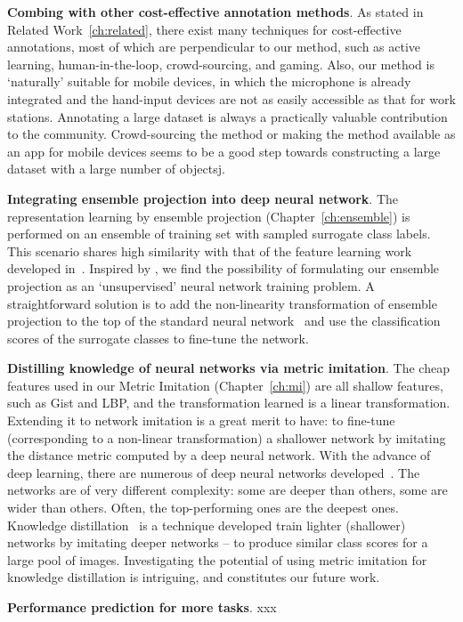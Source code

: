 \textbf{Combing with other cost-effective annotation methods}. As stated in Related Work~\ref{ch:related}, there exist many techniques for cost-effective annotations, most of which are perpendicular to our method, such as active learning, human-in-the-loop, crowd-sourcing, and gaming.  Also, our method is `naturally'  suitable for mobile devices, in which the microphone is already integrated and the hand-input devices are not as easily accessible as that for work stations. Annotating a large dataset is always a practically valuable contribution to the community. Crowd-sourcing the method or making the method available as an app for mobile devices seems to be a good step towards constructing a large dataset with a large number of objectsj.  
 

\textbf{Integrating ensemble projection into deep neural network}. The  representation learning by ensemble projection (Chapter~\ref{ch:ensemble}) is performed on an ensemble of training set with sampled surrogate class labels. This scenario shares high similarity with that of the feature learning work developed in~\citep{cnnfet14}. Inspired by \citep{cnnfet14}, we find the possibility of formulating our ensemble projection as an `unsupervised' neural network training problem. A straightforward solution  is to add the non-linearity transformation of ensemble projection to the top of the standard neural network~\citep{deep:bmvc14} and use the classification scores of the surrogate classes to fine-tune the network.  

 
\textbf{Distilling knowledge of neural networks via metric imitation}. The cheap features used in our Metric Imitation (Chapter~\ref{ch:mi}) are all shallow features, such as Gist and LBP, and the transformation learned is a linear transformation. Extending it to network imitation is a great merit to have: to fine-tune (corresponding to a non-linear transformation) a shallower network by imitating the distance metric computed by a deep neural network. 
With the advance of deep learning, there are numerous of deep neural networks developed~\citep{deepnet:nips12, vgg16, googlenet, ResNet}. The networks are of very different complexity: some are deeper than others, some are wider than others. Often, the top-performing ones  are the deepest ones. 
Knowledge distillation~\citep{DistillingCNN} is a technique developed train lighter (shallower) networks by imitating deeper networks -- to produce similar class scores for a large pool of images.  Investigating the potential of using metric imitation for knowledge distillation is intriguing, and constitutes  our future work. 


\textbf{Performance prediction for more tasks}. xxx 
 


